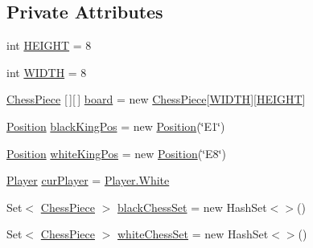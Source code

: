 \subsection*{Private Attributes}
\begin{DoxyCompactItemize}
\item 
int \mbox{\hyperlink{classchess_1_1models_1_1_board_a4abda6f2d6518bacfbfed46214ad9507}{H\+E\+I\+G\+HT}} = 8
\item 
int \mbox{\hyperlink{classchess_1_1models_1_1_board_a87cf88fb8e9e53ae787791cbd114cb33}{W\+I\+D\+TH}} = 8
\item 
\mbox{\hyperlink{classchess_1_1models_1_1_chess_piece}{Chess\+Piece}} \mbox{[}$\,$\mbox{]}\mbox{[}$\,$\mbox{]} \mbox{\hyperlink{classchess_1_1models_1_1_board_a3437f7249afab8766357c12a2da2dbab}{board}} = new \mbox{\hyperlink{classchess_1_1models_1_1_chess_piece}{Chess\+Piece}}\mbox{[}\mbox{\hyperlink{classchess_1_1models_1_1_board_a87cf88fb8e9e53ae787791cbd114cb33}{W\+I\+D\+TH}}\mbox{]}\mbox{[}\mbox{\hyperlink{classchess_1_1models_1_1_board_a4abda6f2d6518bacfbfed46214ad9507}{H\+E\+I\+G\+HT}}\mbox{]}
\item 
\mbox{\hyperlink{classchess_1_1models_1_1_position}{Position}} \mbox{\hyperlink{classchess_1_1models_1_1_board_a052908fb3da796dbd328159704d96be7}{black\+King\+Pos}} = new \mbox{\hyperlink{classchess_1_1models_1_1_position}{Position}}(\char`\"{}E1\char`\"{})
\item 
\mbox{\hyperlink{classchess_1_1models_1_1_position}{Position}} \mbox{\hyperlink{classchess_1_1models_1_1_board_a75fc76cc043240759072dc301833a37a}{white\+King\+Pos}} = new \mbox{\hyperlink{classchess_1_1models_1_1_position}{Position}}(\char`\"{}E8\char`\"{})
\item 
\mbox{\hyperlink{enumchess_1_1models_1_1enums_1_1_player}{Player}} \mbox{\hyperlink{classchess_1_1models_1_1_board_ac1b409757f5ecc1de2e00b6b92ca6605}{cur\+Player}} = \mbox{\hyperlink{enumchess_1_1models_1_1enums_1_1_player_a60ced79fc80ec46a6a2a6f031b27b08e}{Player.\+White}}
\item 
Set$<$ \mbox{\hyperlink{classchess_1_1models_1_1_chess_piece}{Chess\+Piece}} $>$ \mbox{\hyperlink{classchess_1_1models_1_1_board_ac9ce24be7c95629a0fce07798e2de02e}{black\+Chess\+Set}} = new Hash\+Set$<$$>$()
\item 
Set$<$ \mbox{\hyperlink{classchess_1_1models_1_1_chess_piece}{Chess\+Piece}} $>$ \mbox{\hyperlink{classchess_1_1models_1_1_board_a994179278987ea6ec0978ed1ea257145}{white\+Chess\+Set}} = new Hash\+Set$<$$>$()
\end{DoxyCompactItemize}


